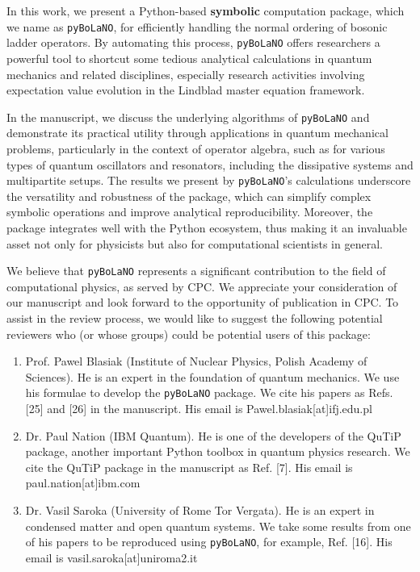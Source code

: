 \documentclass[aps,reprint,onecolumn,amsmath,amssymb,showpacs]{revtex4-1}
\begin{document}
\begin{justify}
\vspace{3px}

In this work, we present a Python-based \textbf{symbolic} computation package, which we name as \texttt{pyBoLaNO}, for efficiently handling the normal ordering of bosonic ladder operators.  By automating this process, \texttt{pyBoLaNO} offers researchers a powerful tool to shortcut some tedious analytical calculations in quantum mechanics and related disciplines, especially research activities involving expectation value evolution in the Lindblad master equation framework.

\vspace{3px}

In the manuscript, we discuss the underlying algorithms of \texttt{pyBoLaNO} and demonstrate its practical utility through applications in quantum mechanical problems, particularly in the context of operator algebra, such as for various types of quantum oscillators and resonators, including the dissipative systems and multipartite setups.  The results we present by \texttt{pyBoLaNO}'s calculations underscore the versatility and robustness of the package, which can simplify complex symbolic operations and improve analytical reproducibility.  Moreover, the package integrates well with the Python ecosystem, thus making it an invaluable asset not only for physicists but also for computational scientists in general.

\vspace{3px}

We believe that \texttt{pyBoLaNO} represents a significant contribution to the field of computational physics, as served by CPC.  We appreciate your consideration of our manuscript and look forward to the opportunity of publication in CPC.  To assist in the review process, we would like to suggest the following potential reviewers who (or whose groups) could be potential users of this package:

\begin{enumerate}
    \item Prof. Pawel Blasiak (Institute of Nuclear Physics, Polish Academy of Sciences).  He is an expert in the foundation of quantum mechanics.  We use his formulae to develop the \texttt{pyBoLaNO} package.  We cite his papers as Refs. [25] and [26] in the manuscript. His email is Pawel.blasiak[at]ifj.edu.pl
    \item Dr. Paul Nation (IBM Quantum).  He is one of the developers of the QuTiP package, another important Python toolbox in quantum physics research.  We cite the QuTiP package in the manuscript as Ref. [7].  His email is paul.nation[at]ibm.com
    \item Dr. Vasil Saroka (University of Rome Tor Vergata).  He is an expert in condensed matter and open quantum systems.  We take some results from one of his papers to be reproduced using \texttt{pyBoLaNO}, for example, Ref. [16].  His email is vasil.saroka[at]uniroma2.it  
\end{enumerate}
    
\end{justify}
\end{document}
